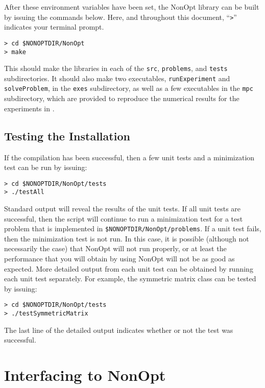 \documentclass{article}
\begin{document}
After these environment variables have been set, the NonOpt library can be built by issuing the commands below.  Here, and throughout this document, ``\texttt{>}'' indicates your terminal prompt.

\begin{verbatim}
> cd $NONOPTDIR/NonOpt
> make
\end{verbatim}

This should make the libraries in each of the \texttt{src}, \texttt{problems}, and \texttt{tests} subdirectories.  It should also
make two executables, \texttt{runExperiment} and \texttt{solveProblem}, in the \texttt{exes} subdirectory, as well as a few executables in the \texttt{mpc} subdirectory, which are provided to reproduce the numerical results for the experiments in \cite{CurtZebi2025}.

\subsection{Testing the Installation}

If the compilation has been successful, then a few unit tests and a minimization test can be run by issuing:

\begin{verbatim}
> cd $NONOPTDIR/NonOpt/tests
> ./testAll
\end{verbatim}

Standard output will reveal the results of the unit tests. If all unit tests are successful, then the script will continue to run a minimization test for a test problem that is implemented in \texttt{\$NONOPTDIR/NonOpt/problems}.  If a unit test fails, then the minimization test is not run.  In this case, it is possible (although not necessarily the case) that NonOpt will not run properly, or at least the performance that you will obtain by using NonOpt will not be as good as expected.  More detailed output from each unit test can be obtained by running each unit test separately. For example, the symmetric matrix class can be tested by issuing:

\begin{verbatim}
> cd $NONOPTDIR/NonOpt/tests
> ./testSymmetricMatrix
\end{verbatim}

The last line of the detailed output indicates whether or not the test was successful.

\section{Interfacing to NonOpt}
\end{document}
